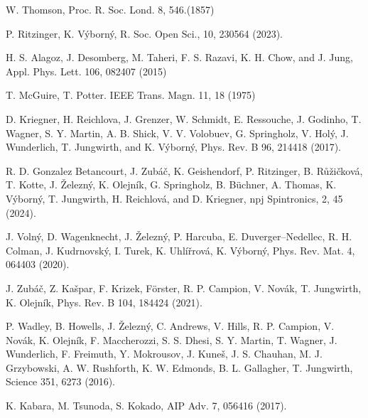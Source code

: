 \documentclass[prb,showpacs,amsmath,amssymb,superscriptaddress,twocolumn,floatfix]{revtex4-1}
\begin{document}
\begin{thebibliography}{99}



 W. Thomson, Proc. R. Soc. Lond. 8, 546.(1857) %

 P. Ritzinger, K. V\'yborn\'y, R. Soc. Open Sci., 10, 230564 (2023). %

 H. S. Alagoz, J. Desomberg, M. Taheri, F. S. Razavi, K. H. Chow, and J. Jung, Appl. Phys. Lett. 106, 082407 (2015)

 T. McGuire, T. Potter. IEEE Trans. Magn. 11, 18 (1975) %

 D. Kriegner, H. Reichlova, J. Grenzer, W. Schmidt, E. Ressouche, J. Godinho, T. Wagner, S. Y. Martin, A. B. Shick, V. V. Volobuev, G. Springholz, V. Hol\'{y}, J. Wunderlich, T. Jungwirth, and K. V\'{y}born\'{y}, Phys. Rev. B 96, 214418 (2017). %

 R. D. Gonzalez Betancourt, J. Zub\'a\v{c}, K. Geishendorf, P. Ritzinger, B. R\r{u}\v{z}i\v{c}kov\'a, T. Kotte, J. \v{Z}elezn\'y, K. Olejn\'ik, G. Springholz, B. B\"uchner, A. Thomas, K. V\'yborn\'y, T. Jungwirth, H. Reichlov\'a, and D. Kriegner, npj Spintronics, 2, 45 (2024). %


 J. Voln\'y, D. Wagenknecht, J. \v{Z}elezn\'y, P. Harcuba, E. Duverger–Nedellec, R. H. Colman, J. Kudrnovsk\'y, I. Turek, K. Uhl\'i\v{r}rov\'a, K. V\'yborn\'y, Phys. Rev. Mat. 4, 064403 (2020).%

 J. Zub\'a\v{c}, Z. Ka\v{s}par, F. Krizek, F\"orster, R. P. Campion, V. Nov\'ak, T. Jungwirth, K. Olejn\'ik, Phys. Rev. B 104, 184424 (2021). %

 P. Wadley, B. Howells, J. \v{Z}elezn\'y, C. Andrews, V. Hills, R. P. Campion, V. Nov\'ak, K. Olejn\'ik, F. Maccherozzi, S. S. Dhesi, S. Y. Martin, T. Wagner, J. Wunderlich, F. Freimuth, Y. Mokrousov, J. Kune\v{s}, J. S. Chauhan, M. J. Grzybowski, A. W. Rushforth, K. W. Edmonds, B. L. Gallagher, T. Jungwirth, Science 351, 6273 (2016). %

 K. Kabara, M. Tsunoda, S. Kokado, AIP Adv. 7, 056416 (2017). %


\end{thebibliography}
\end{document}
